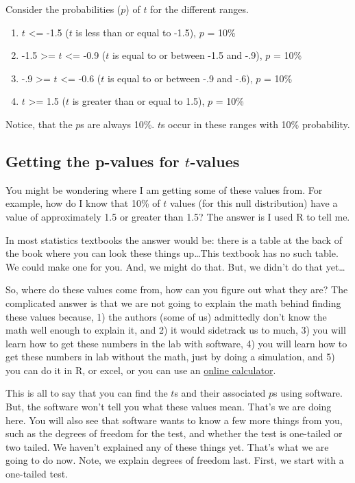 \documentclass[
  letterpaper,
  DIV=11,
  numbers=noendperiod]{scrreprt}
\providecommand{\tightlist}{%
  \setlength{\itemsep}{0pt}\setlength{\parskip}{0pt}}\usepackage{longtable,booktabs,array}
\begin{document}
Consider the probabilities (\(p\)) of \(t\) for the different ranges.

\begin{enumerate}
\def\labelenumi{\arabic{enumi}.}
\tightlist
\item
  \(t\) \textless= -1.5 (\(t\) is less than or equal to -1.5), \(p\) =
  10\%
\item
  -1.5 \textgreater= \(t\) \textless= -0.9 (\(t\) is equal to or between
  -1.5 and -.9), \(p\) = 10\%
\item
  -.9 \textgreater= \(t\) \textless= -0.6 (\(t\) is equal to or between
  -.9 and -.6), \(p\) = 10\%
\item
  \(t\) \textgreater= 1.5 (\(t\) is greater than or equal to 1.5), \(p\)
  = 10\%
\end{enumerate}

Notice, that the \(p\)s are always 10\%. \(t\)s occur in these ranges
with 10\% probability.

\subsection{\texorpdfstring{Getting the p-values for
\(t\)-values}{Getting the p-values for t-values}}\label{getting-the-p-values-for-t-values}

You might be wondering where I am getting some of these values from. For
example, how do I know that 10\% of \(t\) values (for this null
distribution) have a value of approximately 1.5 or greater than 1.5? The
answer is I used R to tell me.

In most statistics textbooks the answer would be: there is a table at
the back of the book where you can look these things up\ldots This
textbook has no such table. We could make one for you. And, we might do
that. But, we didn't do that yet\ldots{}

So, where do these values come from, how can you figure out what they
are? The complicated answer is that we are not going to explain the math
behind finding these values because, 1) the authors (some of us)
admittedly don't know the math well enough to explain it, and 2) it
would sidetrack us to much, 3) you will learn how to get these numbers
in the lab with software, 4) you will learn how to get these numbers in
lab without the math, just by doing a simulation, and 5) you can do it
in R, or excel, or you can use an
\href{http://www.socscistatistics.com/pvalues/tdistribution.aspx}{online
calculator}.

This is all to say that you can find the \(t\)s and their associated
\(p\)s using software. But, the software won't tell you what these
values mean. That's we are doing here. You will also see that software
wants to know a few more things from you, such as the degrees of freedom
for the test, and whether the test is one-tailed or two tailed. We
haven't explained any of these things yet. That's what we are going to
do now. Note, we explain degrees of freedom last. First, we start with a
one-tailed test.
\end{document}

